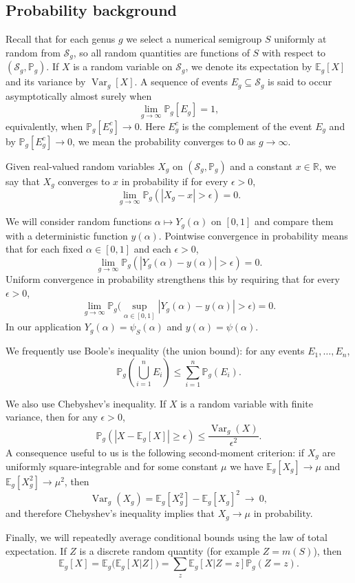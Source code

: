 \documentclass[12pt]{amsart}
\def\E{{\mathbb E}}
\renewcommand{\P}{\mathbb{P}}
\def\R{{\mathbb R}}
\def\SS{{\mathcal S}}
\def\Var{{\operatorname{Var}}}
\begin{document}
\subsection{Probability background}\label{sec:prob}

Recall that for each genus $g$ we select a numerical semigroup $S$ uniformly at random from $\SS_g$, so all random quantities are functions of $S$ with respect to $(\SS_g,\P_g)$.  If $X$ is a random variable on $\SS_g$, we denote its expectation by $\E_{g}[X]$ and its variance by $\Var_{g}[X]$.  A sequence of events $E_g\subseteq \SS_g$ is said to occur asymptotically almost surely when
\[
\lim_{g\to\infty}\P_g[E_g]=1,
\]
equivalently, when $\P_g[E_g^c]\to 0$. Here $E_g^c$ is the complement of the event $E_g$ and by $\P_g[E_g^c]\to 0$, we mean the probability converges to $0$ as $g\to\infty$.

Given real-valued random variables $X_g$ on $(\SS_g,\P_g)$ and a constant $x\in\R$, we say that $X_g$ converges to $x$ in probability if for every $\epsilon>0$,
\[
\lim_{g\to\infty}\P_g\left(|X_g-x|>\epsilon\right)=0.
\]

We will consider random functions $\alpha\mapsto Y_g(\alpha)$ on $[0,1]$ and compare them with a deterministic function $y(\alpha)$. Pointwise convergence in probability means that for each fixed $\alpha\in[0,1]$ and each $\epsilon>0$,
\[
\lim_{g\to\infty}\P_g\left(|Y_g(\alpha)-y(\alpha)|>\epsilon\right)=0.
\]
Uniform convergence in probability strengthens this by requiring that for every $\epsilon>0$,
\[
\lim_{g\to\infty}\P_g\Big(\sup_{\alpha\in[0,1]}|Y_g(\alpha)-y(\alpha)|>\epsilon\Big)=0.
\]
In our application $Y_g(\alpha)=\psi_S(\alpha)$ and $y(\alpha)=\psi(\alpha)$.

We frequently use Boole’s inequality (the union bound): for any events $E_1,\dots,E_n$,
\[
\P_g\left(\bigcup_{i=1}^n E_i\right)\le \sum_{i=1}^n \P_g(E_i).
\]

We also use Chebyshev’s inequality. If $X$ is a random variable with finite variance, then for any $\epsilon>0$,
\[
\P_g\left(|X-\E_g[X]|\ge \epsilon\right)\le \frac{\Var_g(X)}{\epsilon^2}.
\]
A consequence useful to us is the following second-moment criterion: if $X_g$ are uniformly square-integrable and for some constant $\mu$ we have $\E_g[X_g]\to\mu$ and $\E_g[X_g^2]\to \mu^2$, then
\[
\Var_g(X_g)=\E_g[X_g^2]-\E_g[X_g]^2\ \longrightarrow\ 0,
\]
and therefore Chebyshev's inequality implies that $X_g\to \mu$ in probability.

Finally, we will repeatedly average conditional bounds using the law of total expectation. If $Z$ is a discrete random quantity (for example $Z=m(S)$), then
\[
\E_g[X]=\E_g\big(\E_g[X|Z]\big)=\sum_z \E_g[X|Z=z]\P_g(Z=z).
\]
\end{document}
